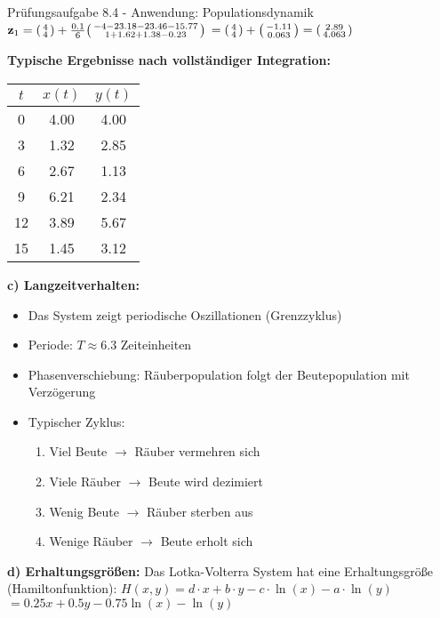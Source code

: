 \begin{example2}{Prüfungsaufgabe 8.4 - Anwendung: Populationsdynamik}
$\mathbf{z}_1 = \begin{psmallmatrix} 4 \\ 4 \end{psmallmatrix} + \frac{0.1}{6}\begin{psmallmatrix} -4 - 23.18 - 23.46 - 15.77 \\ 1 + 1.62 + 1.38 - 0.23 \end{psmallmatrix}$
$= \begin{psmallmatrix} 4 \\ 4 \end{psmallmatrix} + \begin{psmallmatrix} -1.11 \\ 0.063 \end{psmallmatrix} = \begin{psmallmatrix} 2.89 \\ 4.063 \end{psmallmatrix}$

\textbf{Typische Ergebnisse nach vollständiger Integration:}
\begin{center}
\begin{tabular}{|c|c|c|}
\hline
$t$ & $x(t)$ & $y(t)$ \\
\hline
0 & 4.00 & 4.00 \\
3 & 1.32 & 2.85 \\
6 & 2.67 & 1.13 \\
9 & 6.21 & 2.34 \\
12 & 3.89 & 5.67 \\
15 & 1.45 & 3.12 \\
\hline
\end{tabular}
\end{center}

\textbf{c) Langzeitverhalten:}
\begin{itemize}
    \item Das System zeigt periodische Oszillationen (Grenzzyklus)
    \item Periode: $T \approx 6.3$ Zeiteinheiten
    \item Phasenverschiebung: Räuberpopulation folgt der Beutepopulation mit Verzögerung
    \item Typischer Zyklus:
    \begin{enumerate}
        \item Viel Beute $\rightarrow$ Räuber vermehren sich
        \item Viele Räuber $\rightarrow$ Beute wird dezimiert  
        \item Wenig Beute $\rightarrow$ Räuber sterben aus
        \item Wenige Räuber $\rightarrow$ Beute erholt sich
    \end{enumerate}
\end{itemize}

\textbf{d) Erhaltungsgrößen:}
Das Lotka-Volterra System hat eine Erhaltungsgröße (Hamiltonfunktion):
$H(x,y) = d \cdot x + b \cdot y - c \cdot \ln(x) - a \cdot \ln(y)$
$= 0.25x + 0.5y - 0.75\ln(x) - \ln(y)$
\end{example2}

